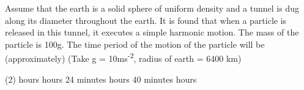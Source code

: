 \item Assume that the earth is a solid sphere of uniform density and a tunnel is dug along its diameter throughout the earth. It is found that when a particle is released in this tunnel, it executes a simple harmonic motion. The mass of the particle is 100g. The time period of the motion of the particle will be (approximately) (Take g = 10ms\textsuperscript{-2}, radius of earth = 6400 km)
    \begin{tasks}(2)
         hours
         hours 24 minutes
         hours 40 minutes
         hours
    \end{tasks}